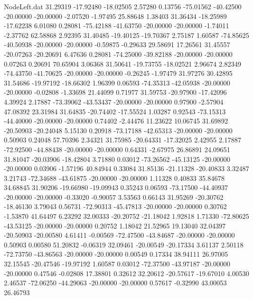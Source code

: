 \begin{filecontents}{NodeLeft.dat}
  31.29319  -17.92480  -18.02505     2.57280    0.13756  -75.01562  -40.42500  -20.00000  -20.00000   -2.07520   -1.97495   25.88648    1.38403
  31.36434  -18.25989  -17.62238     6.01080    0.28081  -75.42188  -41.63750  -20.00000  -20.00000   -1.74011   -2.37762   62.58868    2.92395
  31.40485  -19.40125  -19.70367     2.75187    1.60587  -74.85625  -40.50938  -20.00000  -20.00000   -0.59875   -0.29633   29.58691   17.26561
  31.45557  -20.07263  -20.20691     6.47636    0.28081  -74.25000  -39.82188  -20.00000  -20.00000    0.07263    0.20691   70.65904    3.06368
  31.50641  -19.73755  -18.02521     2.96674    2.82349  -74.43750  -41.70625  -20.00000  -20.00000   -0.26245   -1.97479   31.97276   30.42895
  31.54686  -19.97192  -18.66302     1.96399    0.06593  -74.35313  -42.05938  -20.00000  -20.00000   -0.02808   -1.33698   21.44099    0.71977
  31.59753  -20.97900  -17.42096     4.39924    2.17887  -73.39062  -43.53437  -20.00000  -20.00000    0.97900   -2.57904   47.08392   23.31984
  31.64835  -20.74402  -17.55524     1.03287    0.92543  -73.15313  -44.40000  -20.00000  -20.00000    0.74402   -2.44476   11.23622   10.06745
  31.69892  -20.50903  -20.24048     5.15130    0.20918  -73.17188  -42.65313  -20.00000  -20.00000    0.50903    0.24048   57.70396    2.34321
  31.75985  -20.64331  -17.32025     2.42955    2.17887  -72.92500  -44.88438  -20.00000  -20.00000    0.64331   -2.67975   26.86891   24.09651
  31.81047  -20.03906  -18.42804     3.71880    0.03012  -73.26562  -45.13125  -20.00000  -20.00000    0.03906   -1.57196   40.84944    0.33084
  31.85136  -21.11328  -20.40833     3.32487    3.21743  -72.34688  -43.61875  -20.00000  -20.00000    1.11328    0.40833   35.84678   34.68845
  31.90206  -19.66980  -19.09943     0.35243    0.06593  -73.17500  -44.40937  -20.00000  -20.00000   -0.33020   -0.90057    3.53563    0.66143
  31.95269  -20.30762  -18.46130     3.79043    0.56731  -72.90313  -45.47813  -20.00000  -20.00000    0.30762   -1.53870   41.64497    6.23292
  32.00333  -20.20752  -21.18042     1.92818    1.71330  -72.80625  -43.53125  -20.00000  -20.00000    0.20752    1.18042   21.52965   19.13040
  32.04397  -20.50903  -20.00580     4.61411   -0.00569  -72.47500  -43.84687  -20.00000  -20.00000    0.50903    0.00580   51.20832   -0.06319
  32.09461  -20.00549  -20.17334     3.61137    2.50118  -72.73750  -43.86563  -20.00000  -20.00000    0.00549    0.17334   38.94111   26.97005
  32.15545  -20.47546  -19.97192     1.60587    0.03012  -72.37500  -43.97187  -20.00000  -20.00000    0.47546   -0.02808   17.38801    0.32612
  32.20612  -20.57617  -19.67010     4.00530    2.46537  -72.06250  -44.29063  -20.00000  -20.00000    0.57617   -0.32990   43.00053   26.46793

\end{filecontents}
